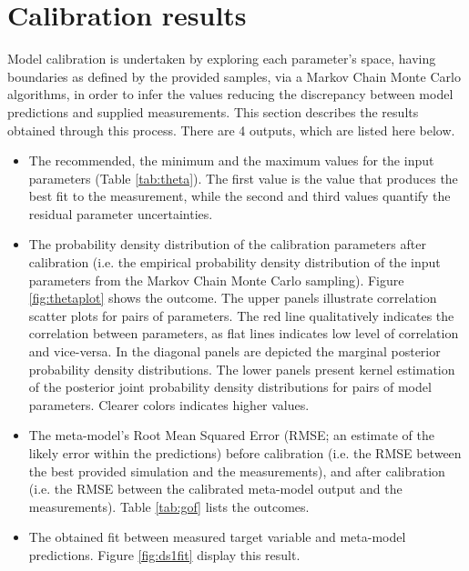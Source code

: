\documentclass[a4paper]{report}\usepackage[]{graphicx}\usepackage[]{xcolor}
\begin{document}


















	\section{Calibration results}\label{sec:cal}
	Model calibration is undertaken by exploring each parameter’s space, having boundaries as defined by the provided samples, 
	via a Markov Chain Monte Carlo algorithms, in order to infer the values reducing the discrepancy between model predictions 
	and supplied measurements. This section describes the results obtained through this process. 
	There are 4 outputs, which are listed here below.
	
\begin{itemize} 
	\item The recommended, the minimum and the maximum values for the input parameters (Table \ref{tab:theta}). The first value is the value that 
	produces the best fit to the measurement, while the second and third values quantify the residual parameter uncertainties.
	\item The probability density distribution of the calibration parameters after calibration (i.e.
	the empirical probability density distribution of the input parameters from the Markov Chain Monte Carlo sampling). Figure 
	\ref{fig:thetaplot} shows the outcome. The upper panels illustrate correlation scatter plots for pairs of parameters. 
	The red line qualitatively indicates the correlation between parameters, as flat lines indicates low level of correlation and vice-versa.
	In the diagonal panels are depicted the marginal posterior probability density distributions.
	The lower panels present kernel estimation of the posterior joint probability density distributions for pairs of model parameters.
	Clearer colors indicates higher values. 
	\item The meta-model’s Root Mean Squared Error (RMSE; an estimate of the likely error within the predictions) before calibration 
	(i.e. the RMSE between the best provided simulation and the measurements), and after calibration (i.e. the RMSE between the calibrated meta-model 
	output and the measurements). Table \ref{tab:gof} lists the outcomes.
\item The obtained fit between measured target variable and meta-model predictions. Figure \ref{fig:ds1fit} display this result.\end{itemize}
\end{document}
